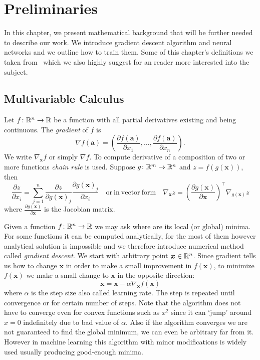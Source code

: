 \chapter{Preliminaries}\label{chap:preliminaries}


In this chapter, we present mathematical background that will be further needed to describe our work. We introduce gradient descent algorithm and neural networks and we outline how to train them. Some of this chapter's definitions we taken from~\cite{Goodfellow-et-al-2016} which we also highly suggest for an reader more interested into the subject.


\section{Multivariable Calculus}
Let $f\colon\mathbb{R}^n\to\mathbb{R}$ be a function with all partial derivatives existing and being continuous. The \textit{gradient} of $f$ is
\begin{equation*}
\nabla f(\bm{a})=\left(\frac{\partial f(\bm{a})}{\partial x_1},\dots,\frac{\partial f(\bm{a})}{\partial x_n}\right).
\end{equation*}
We write $\nabla_{\bm{x}} f$ or simply $\nabla f$.
To compute derivative of a composition of two or more functions \textit{chain rule} is used. Suppose $g\colon\mathbb{R}^m\to\mathbb{R}^n$ and $z=f(g(\bm{x}))$, then
\begin{equation*}
\frac{\partial z}{\partial x_i}=\sum\limits_{j=1}^n\frac{\partial z}{\partial g(\bm{x})_j}\frac{\partial g(\bm{x})_j}{\partial x_i}\quad\mathrm{or\ in\ vector\ form}\quad\nabla_{\bm{x}}z=\left(\frac{\partial g(\bm{x})}{\partial\bm{x}}\right)^\top\nabla_{g(\bm{x})}z
\end{equation*}
where $\frac{\partial g(\bm{x})}{\partial\bm{x}}$ is the Jacobian matrix.

Given a function $f\colon\mathbb{R}^n\to\mathbb{R}$ we may ask where are its local (or global) minima. For some functions it can be computed analytically, for the most of them however analytical solution is impossible and we therefore introduce numerical method called \textit{gradient descent}. We start with arbitrary point $\bm{x}\in \mathbb{R}{^n}$. Since gradient tells us how to change $\bm{x}$ in order to make a small improvement in $f(\bm{x})$, to minimize $f(\bm{x})$ we make a small change to $\bm{x}$ in the opposite direction:
\begin{equation*}
\bm{x}=\bm{x}-\alpha\nabla_{\bm{x}}f(\bm{x})
\end{equation*}
where $\alpha$ is the step size also called learning rate. The step is repeated until convergence or for certain number of steps. Note that the algorithm does not have to converge even for convex functions such as $x^2$ since it can `jump' around $x=0$ indefinitely due to bad value of $\alpha$.
Also if the algorithm converges we are not guaranteed to find the global minimum, we can even be arbitrary far from it. However in machine learning this algorithm with minor modifications is widely used usually producing good-enough minima.

